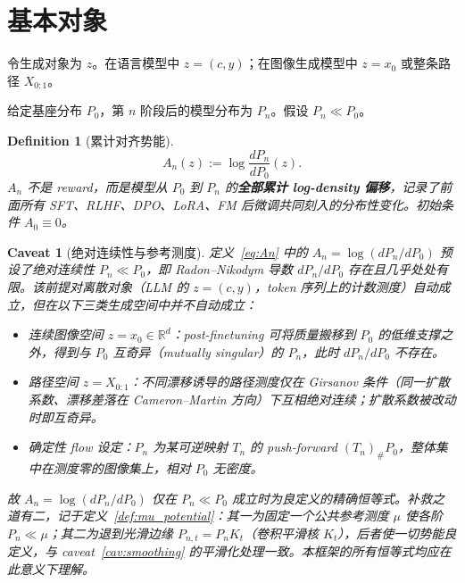 \documentclass[11pt,a4paper]{article}
\newtheorem{definition}[theorem]{Definition}
\newtheorem{caveat}[theorem]{Caveat}
\newcommand{\R}{\mathbb{R}}
\begin{document}
\section{基本对象}
\label{sec:objects}

令生成对象为 $z$。在语言模型中 $z=(c,y)$；在图像生成模型中 $z=x_0$ 或整条路径 $X_{0:1}$。

给定基座分布 $P_0$，第 $n$ 阶段后的模型分布为 $P_n$。假设 $P_n \ll P_0$。

\begin{definition}[累计对齐势能]
\begin{equation}\label{eq:An}
A_n(z) := \log\frac{dP_n}{dP_0}(z).
\end{equation}
$A_n$ 不是 reward，而是模型从 $P_0$ 到 $P_n$ 的\textbf{全部累计 log-density 偏移}，记录了前面所有 SFT、RLHF、DPO、LoRA、FM 后微调共同刻入的分布性变化。初始条件 $A_0 \equiv 0$。
\end{definition}

\begin{caveat}[绝对连续性与参考测度]\label{cav:abscont}
定义~\eqref{eq:An} 中的 $A_n=\log(dP_n/dP_0)$ 预设了绝对连续性 $P_n\ll P_0$，即 Radon--Nikodym 导数 $dP_n/dP_0$ 存在且几乎处处有限。该前提对离散对象（LLM 的 $z=(c,y)$，token 序列上的计数测度）自动成立，但在以下三类生成空间中并不自动成立：
\begin{itemize}
\item \emph{连续图像空间} $z=x_0\in\R^d$：post-finetuning 可将质量搬移到 $P_0$ 的低维支撑之外，得到与 $P_0$ 互奇异（mutually singular）的 $P_n$，此时 $dP_n/dP_0$ 不存在。
\item \emph{路径空间} $z=X_{0:1}$：不同漂移诱导的路径测度仅在 Girsanov 条件（同一扩散系数、漂移差落在 Cameron--Martin 方向）下互相绝对连续；扩散系数被改动时即互奇异。
\item \emph{确定性 flow 设定}：$P_n$ 为某可逆映射 $T_n$ 的 push-forward $(T_n)_\#P_0$，整体集中在测度零的图像集上，相对 $P_0$ 无密度。
\end{itemize}
故 $A_n=\log(dP_n/dP_0)$ 仅在 $P_n\ll P_0$ 成立时为良定义的精确恒等式。补救之道有二，记于定义~\ref{def:mu_potential}：其一为固定一个公共参考测度 $\mu$ 使各阶 $P_n\ll\mu$；其二为退到光滑边缘 $P_{n,t}=P_nK_t$（卷积平滑核 $K_t$），后者使一切势能良定义，与 caveat~\ref{cav:smoothing} 的平滑化处理一致。本框架的所有恒等式均应在此意义下理解。
\end{caveat}
\end{document}

